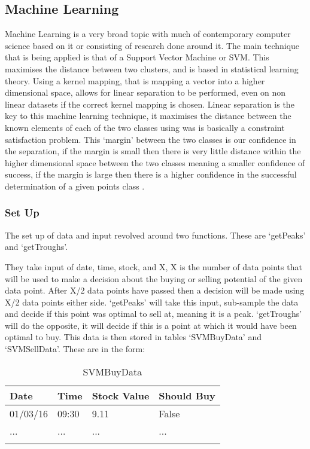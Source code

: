 \documentclass[12pt,a4paper]{article}
\begin{document}
\iffalse
#################################################################################
\fi

\subsection*{Machine Learning}

Machine Learning is a very broad topic with much of contemporary computer science based on it or consisting of research done around it. The main technique that is being applied is that of a Support Vector Machine or SVM. This maximises the distance between two clusters, and is based in statistical learning theory. Using a kernel mapping, that is mapping a vector into a higher dimensional space, allows for linear separation to be performed, even on non linear datasets if the correct kernel mapping is chosen. Linear separation is the key to this machine learning technique, it maximises the distance between the known elements of each of the two classes using was is basically a constraint satisfaction problem. This `margin' between the two classes is our confidence in the separation, if the margin is small then there is very little distance within the higher dimensional space between the two classes meaning a smaller confidence of success, if the margin is large then there is a higher confidence in the successful determination of a given points class \cite{Wilson2008}. 

\subsubsection*{Set Up}

The set up of data and input revolved around two functions. These are `getPeaks' and `getTroughs'.

They take input of date, time, stock, and X, X is the number of data points that will be used to make a decision about the buying or selling potential of the given data point. After X/2 data points have passed then a decision will be made using X/2 data points either side. `getPeaks' will take this input, sub-sample the data and decide if this point was optimal to sell at, meaning it is a peak. `getTroughs' will do the opposite, it will decide if this is a point at which it would have been optimal to buy. This data is then stored in tables `SVMBuyData' and `SVMSellData'. These are in the form:

\label{units}
\begin{longtable}{ |p{2.25cm}|p{2.25cm}|p{2.25cm}|p{2.25cm}| }\hline\hline
Date & Time & Stock Value & Should Buy \\ \hline
01/03/16 & 09:30 & 9.11 & False  \\ \hline
... & ... & ... & ...  \\ \hline
\caption{SVMBuyData}
\end{longtable}
\end{document}
